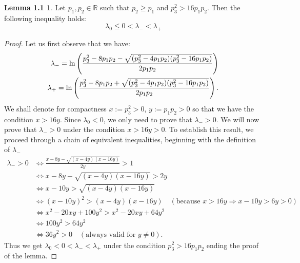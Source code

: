 \documentclass[a4paper, 10pt]{article}
\newcommand{\bea}{\begin{eqnarray}}
\newcommand{\eea}{\end{eqnarray}}
\theoremstyle{definition}
\begin{document}
\newtheorem*{manuallemma}{Lemma 1.1}
\begin{manuallemma}
\label{lemma:lambda_ordering}
Let $p_1, p_2 \in \mathbb{R}$ such that $p_2 \geq p_1$ and $p_3^2>16p_1p_2$. Then the following inequality holds:
\[
\lambda_0 \leq 0 <\lambda_- <   \lambda_+
\]
\end{manuallemma}
\begin{proof}Let us first observe that we have:
\bea \lambda_{-}= \ln\left(\frac{p_3^2-8p_1p_2 - \sqrt{(p_3^2-4p_1p_2)(p_3^2-16p_1p_2)}}{2p_1p_2}\right) \cr \lambda_{+} =\ln\left(\frac{p_3^2-8p_1p_2 +  \sqrt{(p_3^2-4p_1p_2)(p_3^2-16p_1p_2)}}{2p_1p_2}\right) .\eea
We shall denote for compactness $x := p_3^2>0$, $y := p_1p_2>0$ so that we have the condition $x>16y$. Since $\lambda_0<0$, we only need to prove that $\lambda_->0$. We will now prove that $\lambda_{-} > 0$ under the condition $x > 16y>0$. To establish this result, we proceed through a chain of equivalent inequalities, beginning with the definition of $\lambda_{-}$
\begin{align*}
\lambda_{-} > 0 
&\iff \frac{x - 8y - \sqrt{(x-4y)(x-16y)}}{2y} > 1 \\
&\iff x - 8y - \sqrt{(x-4y)(x-16y)} > 2y \\
&\iff x - 10y > \sqrt{(x-4y)(x-16y)} \\
&\iff (x - 10y)^2 > (x-4y)(x-16y) \quad (\text{because } x > 16y \Rightarrow x-10y > 6y > 0) \\
&\iff x^2 - 20xy + 100y^2 > x^2 - 20xy + 64y^2 \\
&\iff 100y^2 > 64y^2 \\
&\iff 36y^2 > 0 \quad (\text{always valid for  } y \neq 0).
\end{align*}
Thus we get  $\lambda_0 < 0 <\lambda_- <   \lambda_+$ under the condition $p_3^2>16p_1p_2$ ending the proof of the lemma.  
\end{proof}
\end{document}
